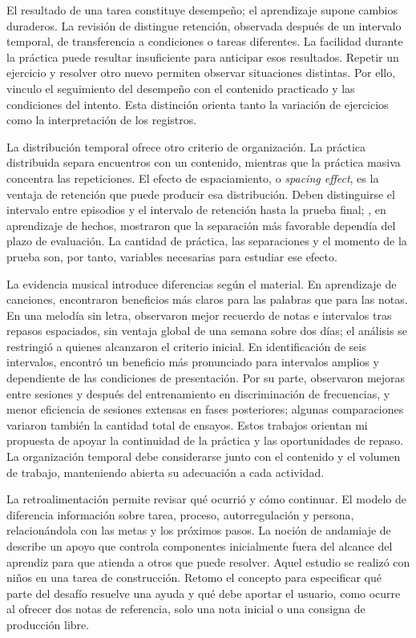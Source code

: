 El resultado de una tarea constituye desempeño; el aprendizaje supone cambios
duraderos. La revisión de \textcite{soderstrom2015learning} distingue retención,
observada después de un intervalo temporal, de transferencia a condiciones o
tareas diferentes. La facilidad durante la práctica puede resultar insuficiente
para anticipar esos resultados. Repetir un ejercicio y resolver otro nuevo
permiten observar situaciones distintas. Por ello, vinculo el seguimiento del
desempeño con el contenido practicado y las condiciones del intento. Esta
distinción orienta tanto la variación de ejercicios como la interpretación
de los registros.

La distribución temporal ofrece otro criterio de organización. La práctica
distribuida separa encuentros con un contenido, mientras que la práctica masiva
concentra las repeticiones. El efecto de espaciamiento, o \textit{spacing effect},
es la ventaja de retención que puede producir esa distribución. Deben distinguirse
el intervalo entre episodios y el intervalo de retención hasta la prueba final;
\textcite{cepeda2008spacing}, en aprendizaje de hechos, mostraron que la separación
más favorable dependía del plazo de evaluación. La cantidad de práctica, las
separaciones y el momento de la prueba son, por tanto, variables necesarias
para estudiar ese efecto.

La evidencia musical introduce diferencias según el material. En aprendizaje de
canciones, \textcite{katz2021spacing} encontraron beneficios más claros para las
palabras que para las notas. En una melodía sin letra, \textcite{katz2025melodic}
observaron mejor recuerdo de notas e intervalos tras repasos espaciados, sin
ventaja global de una semana sobre dos días; el análisis se restringió a quienes
alcanzaron el criterio inicial. En identificación de seis intervalos,
\textcite{hua2015intervals} encontró un beneficio más pronunciado para intervalos
amplios y dependiente de las condiciones de presentación. Por su parte,
\textcite{molloy2012auditory} observaron mejoras entre sesiones y después del
entrenamiento en discriminación de frecuencias, y menor eficiencia de sesiones
extensas en fases posteriores; algunas comparaciones variaron también la cantidad
total de ensayos. Estos trabajos orientan mi propuesta de apoyar la continuidad
de la práctica y las oportunidades de repaso. La organización temporal debe
considerarse junto con el contenido y el volumen de trabajo, manteniendo abierta
su adecuación a cada actividad.

La retroalimentación permite revisar qué ocurrió y cómo continuar. El modelo
de \textcite{hattie2007feedback} diferencia información sobre tarea, proceso,
autorregulación y persona, relacionándola con las metas y los próximos pasos.
La noción de andamiaje de \textcite{wood1976tutoring} describe un apoyo que controla
componentes inicialmente fuera del alcance del aprendiz para que atienda a otros
que puede resolver. Aquel estudio se realizó con niños en una tarea de construcción.
Retomo el concepto para especificar qué parte del desafío resuelve una ayuda y
qué debe aportar el usuario, como ocurre al ofrecer dos notas de referencia,
solo una nota inicial o una consigna de producción libre.

